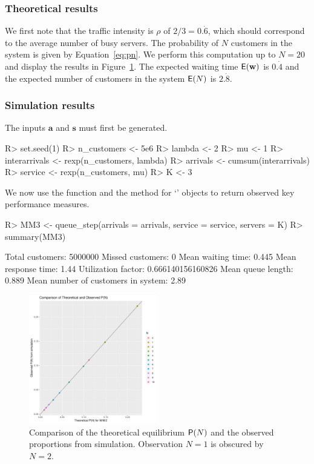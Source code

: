\documentclass[article]{jss}
\begin{document}
\subsubsection{Theoretical results}

We first note that the traffic intensity is $\rho$ of
$2/3 = 0.\dot{6}$, which should correspond to the average number of
busy servers. The probability of $N$ customers in the system is given
by Equation~\ref{eq:pn}. We perform this computation up to $N = 20$
and display the results in Figure~\ref{fig:theoretical}. The expected
waiting time $\mathsf{E}(\mathbf{w})$ is $0.\dot{4}$ and the expected
number of customers in the system $\mathsf{E}(N)$ is $2.\dot{8}$.

\subsubsection{Simulation results}

The inputs $\mathbf{a}$ and $\mathbf{s}$ must first be generated. 
%
\begin{CodeChunk}
\begin{Sinput}
R> set.seed(1) 
R> n_customers <- 5e6
R> lambda <- 2
R> mu <- 1
R> interarrivals <- rexp(n_customers, lambda)
R> arrivals <- cumsum(interarrivals)
R> service <- rexp(n_customers, mu)
R> K <- 3
\end{Sinput}
\end{CodeChunk}
%
We now use the  function and the 
method for `' objects to return observed key
performance measures.
%
\begin{CodeChunk}
\begin{Sinput}
R> MM3 <- queue_step(arrivals = arrivals, service = service, servers = K)
R> summary(MM3)
\end{Sinput}
\begin{Soutput}
Total customers:
 5000000
Missed customers:
 0
Mean waiting time:
 0.445
Mean response time:
 1.44
Utilization factor:
 0.666140156160826
Mean queue length:
 0.889
Mean number of customers in system:
 2.89
\end{Soutput}
\end{CodeChunk}
%
\begin{figure}[t!]
  \centering
  \includegraphics[width = 0.5\textwidth, trim = 0 5 0 5, clip]{theoretical.pdf}
  \caption{Comparison of the theoretical equilibrium $\mathsf{P}(N)$ and
    the observed proportions from simulation. Observation $N = 1$ is
    obscured by $N = 2$.}
  \label{fig:theoretical}
\end{figure}
\end{document}
